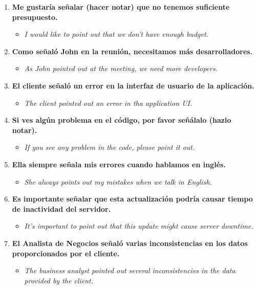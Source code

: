 \documentclass[
10pt, %
a4paper, %
oneside, %
headinclude,footinclude, %
BCOR5mm, %
]{scrartcl}
\begin{document}
\begin{enumerate}
	\item \textbf{Me gustaría señalar (hacer notar) que no tenemos suficiente presupuesto.}
	\begin{itemize}
		\item \textit{I would like to point out that we don't have enough budget.}
	\end{itemize}
	\item \textbf{Como señaló John en la reunión, necesitamos más desarrolladores.}
	\begin{itemize}
		\item \textit{As John pointed out at the meeting, we need more developers.}
	\end{itemize}
	\item \textbf{El cliente señaló un error en la interfaz de usuario de la aplicación.}
	\begin{itemize}
		\item \textit{The client pointed out an error in tha application UI.}
	\end{itemize}
	\item \textbf{Si ves algún problema en el código, por favor señálalo (hazlo notar).}
	\begin{itemize}
		\item \textit{If you see any problem in the code, please point it out.}
	\end{itemize}
	\item \textbf{Ella siempre señala mis errores cuando hablamos en inglés.}
	\begin{itemize}
		\item \textit{She always points out my mistakes when we talk in English.}
	\end{itemize}
	\item \textbf{Es importante señalar que esta actualización podría causar tiempo de inactividad del servidor.}
	\begin{itemize}
		\item \textit{It's important to point out that this update might cause server downtime.}
	\end{itemize}
	\item \textbf{El Analista de Negocios señaló varias inconsistencias en los datos proporcionados por el cliente.}
	\begin{itemize}
		\item \textit{The business analyst pointed out several inconsistencies in the data provided by the client.}
	\end{itemize}

\end{enumerate}
\end{document}
